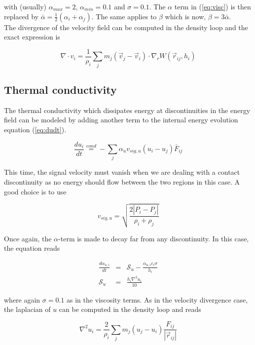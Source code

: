\documentclass[a4paper,10pt]{article}
\begin{document}
with (usually) $\alpha_{max} = 2$, $\alpha_{min} = 0.1$ and $\sigma=0.1$. The $\alpha$ term in (\ref{eq:visc}) is then
replaced by $\bar\alpha = \frac{1}{2}(\alpha_i + \alpha_j)$. The same applies to $\beta$ which is now, $\beta =
3\bar\alpha$.\\
The divergence of the velocity field can be computed in the density loop and the exact expression is

\begin{equation}
 \label{eq:div_v}
 \nabla\cdot v_i = \frac{1}{\rho_i}\sum_j m_j \left(\vec{v}_j - \vec{v}_i\right)\cdot \nabla_r W(\vec{r}_{ij},h_i) 
\end{equation}

\subsection{Thermal conductivity}

The thermal conductivity  which dissipates energy at discontinuities in the energy field can be modeled by adding
another term to the internal energy evolution equation (\ref{eq:dudt}). 

\begin{equation}
 \frac{du_i}{dt} \stackrel{cond}{=} - \sum_j \alpha_u v_{sig,u}\left(u_i - u_j\right)\bar{F}_{ij}
\end{equation}

This time, the signal velocity must vanish when we are dealing with a contact discontinuity as no energy should flow
between the two regions in this case. A good choice is to use

\begin{equation}
 v_{sig,u} = \sqrt{\frac{2|P_i-P_j|}{\rho_i+\rho_j}}
\end{equation}

Once again, the $\alpha$-term is made to decay far from any discontinuity. In this case, the equation reads

\begin{eqnarray}
 \frac{d\alpha_{u,i}}{dt} &=&  \mathcal{S}_u - \frac{\alpha_{u,i}c_i\sigma}{h_i}  \\
 \mathcal{S}_u &=& \frac{h_i \nabla^2 u_i}{10}
\end{eqnarray}

where again $\sigma=0.1$ as in the viscosity terms. As in the velocity divergence case, the laplacian of $u$ can be
computed in the density loop and reads

\begin{equation}
 \nabla^2 u_i = \frac{2}{\rho_i} \sum_j m_j \left(u_j - u_i\right) \frac{F_{ij}}{|\vec{r}_{ij}|}
\end{equation}
\end{document}
